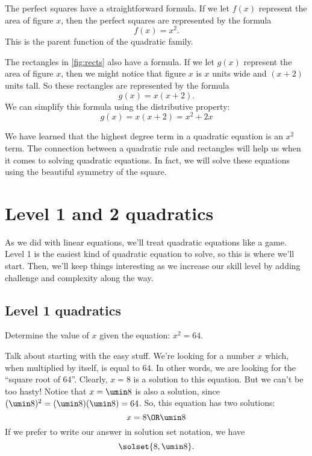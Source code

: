 The perfect squares have a straightforward formula. If we let $f(x)$ represent the area of figure $x$, then the perfect squares are represented by the formula
\[f(x)=x^2.\]
This is the parent function of the quadratic family.

The rectangles in \cref{fig:rects} also have a formula. If we let $g(x)$ represent the area of figure $x$, then we might notice that figure $x$ is $x$ units wide and $(x+2)$ units tall. So these rectangles are represented by the formula
\[g(x) = x(x+2).\]
We can simplify this formula using the distributive property:
\[g(x) = x(x+2) = x^2 + 2x\]

We have learned that the highest degree term in a quadratic equation is an $x^2$ term. The connection between a quadratic rule and rectangles will help us when it comes to solving quadratic equations. In fact, we will solve these equations using the beautiful symmetry of the square.

\section{Level 1 and 2 quadratics}

As we did with linear equations, we'll treat quadratic equations like a game. Level 1 is the easiest kind of quadratic equation to solve, so this is where we'll start. Then, we'll keep things interesting as we increase our skill level by adding challenge and complexity along the way.

\subsection{Level 1 quadratics}

\begin{boxexplore}
Determine the value of $x$ given the equation: $x^2 = 64$.
\end{boxexplore} %

Talk about starting with the easy stuff. We're looking for a number $x$ which, when multiplied by itself, is equal to 64. In other words, we are looking for the ``square root of 64''. Clearly, $x=8$ is a solution to this equation. But we can't be too hasty! Notice that $x=\umin8$ is also a solution, since $(\umin8)^2 = (\umin8)(\umin8) = 64$. So, this equation has two solutions:
\[x = 8 \OR \umin8\]
If we prefer to write our answer in solution set notation, we have \[\solset{8,\umin8}.\]

